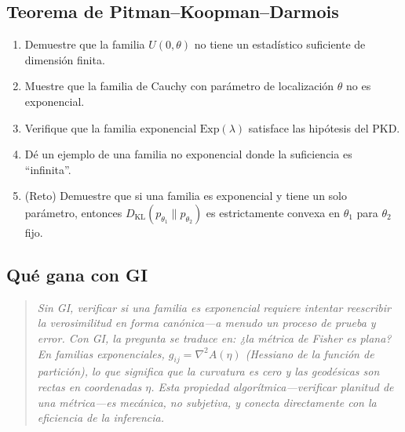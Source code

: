 \subsection*{Teorema de Pitman--Koopman--Darmois}
\begin{enumerate}[resume]
	\item[$\star\star\star$] Demuestre que la familia $U(0, \theta)$ no tiene un estadístico suficiente de dimensión finita.
	\item[$\star\star\star$] Muestre que la familia de Cauchy con parámetro de localización $\theta$ no es exponencial.
	\item[$\star\star$] Verifique que la familia exponencial $\mathrm{Exp}(\lambda)$ satisface las hipótesis del PKD.
	\item[$\star\star$] Dé un ejemplo de una familia no exponencial donde la suficiencia es ``infinita''.
	\item[$\star\star\star\star$] (Reto) Demuestre que si una familia es exponencial y tiene un solo parámetro, entonces $D_{\mathrm{KL}}(p_{\theta_1} \| p_{\theta_2})$ es estrictamente convexa en $\theta_1$ para $\theta_2$ fijo.
\end{enumerate}

\subsection*{Qué gana con GI}
\begin{quote}
	\itshape
	Sin GI, verificar si una familia es exponencial requiere intentar reescribir la verosimilitud en forma canónica---a menudo un proceso de prueba y error.  Con GI, la pregunta se traduce en: ¿la métrica de Fisher es plana?  En familias exponenciales, $g_{ij} = \nabla^2 A(\eta)$ (Hessiano de la función de partición), lo que significa que la curvatura es cero y las geodésicas son rectas en coordenadas $\eta$.  Esta propiedad algorítmica---verificar planitud de una métrica---es mecánica, no subjetiva, y conecta directamente con la eficiencia de la inferencia.
\end{quote}
